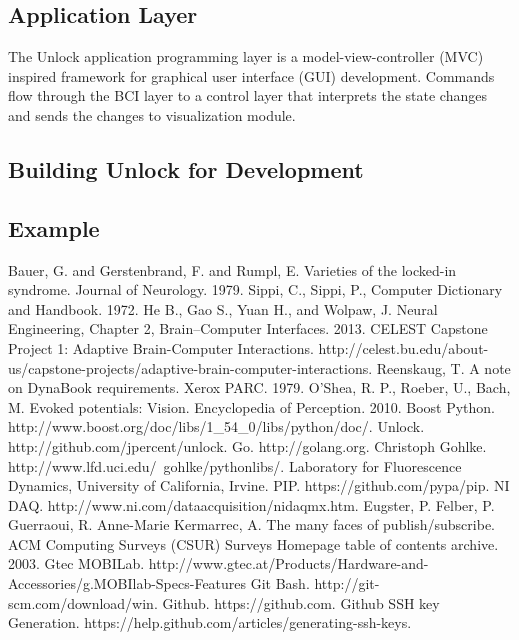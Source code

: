 \documentclass[11pt]{article}
\begin{document}
\subsection{Application Layer}\label{applicationsec}

The Unlock application programming layer is a model-view-controller (MVC)~\cite{mvc, mvc2} inspired framework for graphical user interface (GUI) development.  Commands flow through the BCI layer to a control layer that interprets the state changes and sends the changes to visualization module.

\subsection{Building Unlock for Development}
\subsection{Example}

\begin{thebibliography}{99}
  Bauer, G. and Gerstenbrand, F. and Rumpl, E. Varieties of the locked-in syndrome. Journal of Neurology.  1979.
  Sippi, C.,  Sippi, P., Computer Dictionary and Handbook. 1972. 
  He B., Gao S., Yuan H., and Wolpaw, J.  Neural Engineering, Chapter 2, Brain–Computer Interfaces.  2013.
 CELEST Capstone Project 1: Adaptive Brain-Computer Interactions.  http://celest.bu.edu/about-us/capstone-projects/adaptive-brain-computer-interactions.
  Reenskaug, T. A note on DynaBook requirements. Xerox PARC.  1979.
 O’Shea, R. P., Roeber, U., Bach, M. Evoked potentials: Vision.  Encyclopedia of Perception. 2010.
 Boost Python.  http://www.boost.org/doc/libs/1\_54\_0/libs/python/doc/.
 Unlock.  http://github.com/jpercent/unlock.
 Go.  http://golang.org.
  Christoph Gohlke.  http://www.lfd.uci.edu/~gohlke/pythonlibs/.  Laboratory for Fluorescence Dynamics, University of California, Irvine.
 PIP.  https://github.com/pypa/pip.
 NI DAQ.  http://www.ni.com/dataacquisition/nidaqmx.htm.
 Eugster, P.  Felber, P.  Guerraoui, R.  Anne-Marie Kermarrec, A.  The many faces of publish/subscribe.  ACM Computing Surveys (CSUR) Surveys Homepage table of contents archive.  2003.
 Gtec MOBILab.  http://www.gtec.at/Products/Hardware-and-Accessories/g.MOBIlab-Specs-Features
 Git Bash.  http://git-scm.com/download/win.
  Github.  https://github.com.
 Github SSH key Generation.  https://help.github.com/articles/generating-ssh-keys.
\end{thebibliography}
\end{document}
